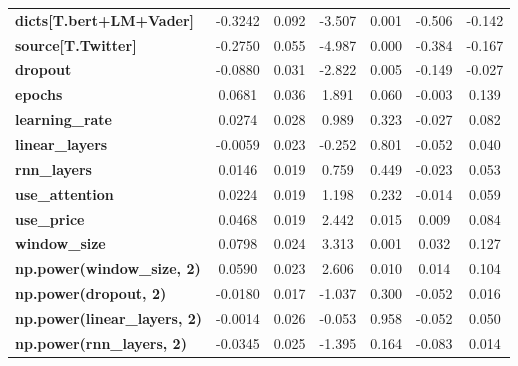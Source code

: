 \begin{center}
\begin{tabular}{lcccccc}
\textbf{dicts[T.bert+LM+Vader]}      &      -0.3242  &        0.092     &    -3.507  &         0.001        &       -0.506    &       -0.142     \\
\textbf{source[T.Twitter]}           &      -0.2750  &        0.055     &    -4.987  &         0.000        &       -0.384    &       -0.167     \\
\textbf{dropout}                     &      -0.0880  &        0.031     &    -2.822  &         0.005        &       -0.149    &       -0.027     \\
\textbf{epochs}                      &       0.0681  &        0.036     &     1.891  &         0.060        &       -0.003    &        0.139     \\
\textbf{learning\_rate}              &       0.0274  &        0.028     &     0.989  &         0.323        &       -0.027    &        0.082     \\
\textbf{linear\_layers}              &      -0.0059  &        0.023     &    -0.252  &         0.801        &       -0.052    &        0.040     \\
\textbf{rnn\_layers}                 &       0.0146  &        0.019     &     0.759  &         0.449        &       -0.023    &        0.053     \\
\textbf{use\_attention}              &       0.0224  &        0.019     &     1.198  &         0.232        &       -0.014    &        0.059     \\
\textbf{use\_price}                  &       0.0468  &        0.019     &     2.442  &         0.015        &        0.009    &        0.084     \\
\textbf{window\_size}                &       0.0798  &        0.024     &     3.313  &         0.001        &        0.032    &        0.127     \\
\textbf{np.power(window\_size, 2)}   &       0.0590  &        0.023     &     2.606  &         0.010        &        0.014    &        0.104     \\
\textbf{np.power(dropout, 2)}        &      -0.0180  &        0.017     &    -1.037  &         0.300        &       -0.052    &        0.016     \\
\textbf{np.power(linear\_layers, 2)} &      -0.0014  &        0.026     &    -0.053  &         0.958        &       -0.052    &        0.050     \\
\textbf{np.power(rnn\_layers, 2)}    &      -0.0345  &        0.025     &    -1.395  &         0.164        &       -0.083    &        0.014     \\

\end{tabular}
\end{center}
